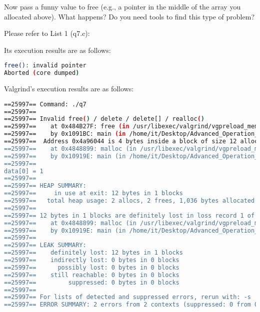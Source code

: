 \documentclass[10pt, answers]{exam}
\begin{document}
\begin{questions} 
    \setcounter{question}{6} 
    
    \question 
    Now pass a funny value to free (e.g., a pointer in the middle of the
    array you allocated above). What happens? Do you need tools to
    find this type of problem?

    
    \begin{solution}
    Please refer to List 1 (q7.c):
    
    
    
    Its execution results are as follows:
    
    \begin{lstlisting}[language=bash]
free(): invalid pointer
Aborted (core dumped)
    \end{lstlisting}
    
    Valgrind's execution results are as follows:
    
    \begin{lstlisting}[language=bash]
==25997== Command: ./q7
==25997==
==25997== Invalid free() / delete / delete[] / realloc()
==25997==    at 0x484B27F: free (in /usr/libexec/valgrind/vgpreload_memcheck-amd64-linux.so)
==25997==    by 0x1091BC: main (in /home/it/Desktop/Advanced_Operation_Systen/hw3/q7)
==25997==  Address 0x4a96044 is 4 bytes inside a block of size 12 alloc'd
==25997==    at 0x4848899: malloc (in /usr/libexec/valgrind/vgpreload_memcheck-amd64-linux.so)
==25997==    by 0x10919E: main (in /home/it/Desktop/Advanced_Operation_Systen/hw3/q7)
==25997==
data[0] = 1
==25997==
==25997== HEAP SUMMARY:
==25997==     in use at exit: 12 bytes in 1 blocks
==25997==   total heap usage: 2 allocs, 2 frees, 1,036 bytes allocated
==25997==
==25997== 12 bytes in 1 blocks are definitely lost in loss record 1 of 1
==25997==    at 0x4848899: malloc (in /usr/libexec/valgrind/vgpreload_memcheck-amd64-linux.so)
==25997==    by 0x10919E: main (in /home/it/Desktop/Advanced_Operation_Systen/hw3/q7)
==25997==
==25997== LEAK SUMMARY:
==25997==    definitely lost: 12 bytes in 1 blocks
==25997==    indirectly lost: 0 bytes in 0 blocks
==25997==      possibly lost: 0 bytes in 0 blocks
==25997==    still reachable: 0 bytes in 0 blocks
==25997==         suppressed: 0 bytes in 0 blocks
==25997==
==25997== For lists of detected and suppressed errors, rerun with: -s
==25997== ERROR SUMMARY: 2 errors from 2 contexts (suppressed: 0 from 0)
    \end{lstlisting}
    

\end{solution}
\end{questions}
\end{document}
